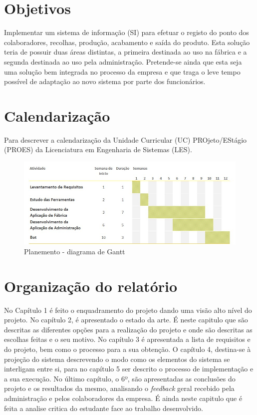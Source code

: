 \section{Objetivos}
Implementar um sistema de informação (SI\label{sym:SI}) para efetuar o registo do ponto dos colaboradores, recolhas, produção, acabamento e saída do produto. Esta solução teria de possuir duas áreas distintas, a primeira destinada ao uso na fábrica e a segunda destinada ao uso pela administração. Pretende-se ainda que esta seja uma solução bem integrada no processo da empresa e que traga o leve tempo possível de adaptação ao novo sistema por parte dos funcionários.

\section{Calendarização}
Para descrever a calendarização da Unidade Curricular (UC\label{sym:UC}) PROjeto/EStágio (PROES\label{sym:PROES}) da Licenciatura em Engenharia de Sistemas (LES).

\begin{figure}[htbp] 
	\begin{center}
		\includegraphics[width=\textwidth,keepaspectratio]{figuras/DiagramaGant.jpg}
		\caption{Planemento - diagrama de Gantt}
		\label{fig:gantt chart} 
	\end{center}
\end{figure}

\section{Organização do relatório}
No Capítulo 1 é feito o enquadramento do projeto dando uma visão alto nível do projeto. No capítulo 2, é apresentado o estado da arte. É neste capitulo que são descritas as diferentes opções para a realização do projeto e onde são descritas as escolhas feitas e o seu motivo. No capítulo 3 é apresentada a lista de requisitos e do projeto, bem como o processo para a sua obtenção. O capítulo 4, destina-se à projeção do sistema descrevendo o modo como os elementos do sistema se interligam entre si, para no capítulo 5 ser descrito o processo de implementação e a sua execução. No último capítulo, o 6º, são apresentadas as conclusões do projeto e os resultados da mesmo, analisando o \textit{feedback} geral recebido pela administração e pelos colaboradores da empresa. É ainda neste capitulo que é feita a analise critica do estudante face ao trabalho desenvolvido.
